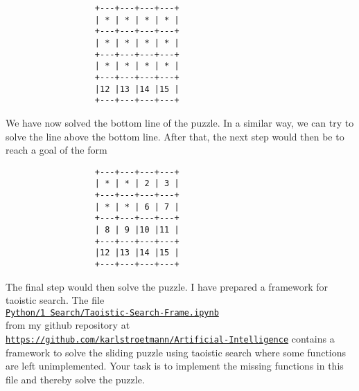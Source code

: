  \begin{verbatim}
                  +---+---+---+---+
                  | * | * | * | * |
                  +---+---+---+---+
                  | * | * | * | * |
                  +---+---+---+---+
                  | * | * | * | * |
                  +---+---+---+---+
                  |12 |13 |14 |15 |
                  +---+---+---+---+
 \end{verbatim}
 We have now solved the bottom line of the puzzle.  In a similar way, we can try to solve the line above the
 bottom line.  After that, the next step would then be to reach a goal of the form
 \begin{verbatim}
                  +---+---+---+---+
                  | * | * | 2 | 3 |
                  +---+---+---+---+
                  | * | * | 6 | 7 |
                  +---+---+---+---+
                  | 8 | 9 |10 |11 |
                  +---+---+---+---+
                  |12 |13 |14 |15 |
                  +---+---+---+---+
\end{verbatim}
The final step would then solve the puzzle.  I have prepared a framework for taoistic search.  The file
\\[0.2cm]
\hspace*{1.5cm}
\href{https://github.com/karlstroetmann/Artificial-Intelligence/blob/master/Python/1%20Search/Taoistic-Search-Frame.ipynb}{\texttt{Python/1 Search/Taoistic-Search-Frame.ipynb}}
\\[0.2cm]
from my github repository at
\href{https://github.com/karlstroetmann/Artificial-Intelligence/}{\texttt{https://github.com/karlstroetmann/Artificial-Intelligence}} \linebreak
contains a framework to solve the sliding puzzle using taoistic search where some functions are left unimplemented.  
 Your task is to implement the missing functions in this file and thereby solve the puzzle.
 \eox

